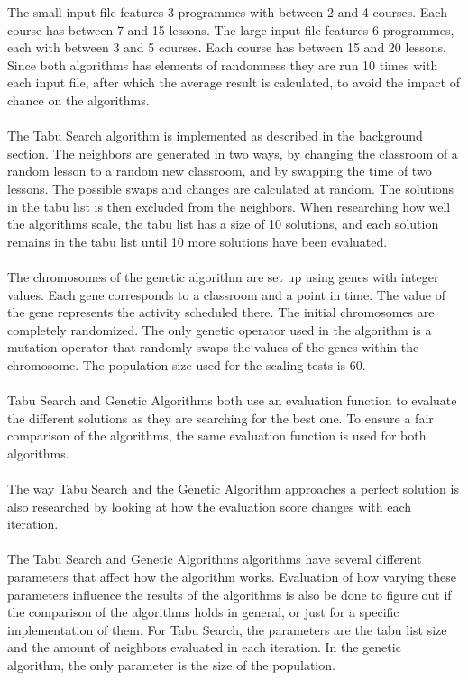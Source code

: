 \documentclass[titlepage,a4paper]{article}
\begin{document}
The small input file features 3 programmes with between 2 and 4 courses. Each course has between 7 and 15 lessons.
The large input file features 6 programmes, each with between 3 and 5 courses. Each course has between 15 and 20 lessons.
Since both algorithms has elements of randomness they are run 10 times with each input file, after which the average result is calculated, to avoid the impact of chance on the algorithms. \\\\
The Tabu Search algorithm is implemented as described in the background section. The neighbors are generated in two ways, by changing the classroom of a random lesson to a random new classroom, and by swapping the time of two lessons. The possible swaps and changes are calculated at random. The solutions in the tabu list is then excluded from the neighbors. When researching how well the algorithms scale, the tabu list has a size of 10 solutions, and each solution remains in the tabu list until 10 more solutions have been evaluated. \\\\
The chromosomes of the genetic algorithm are set up using genes with integer values. Each gene corresponds to a classroom and a point in time. The value of the gene represents the activity scheduled there. The initial chromosomes are completely randomized. The only genetic operator used in the algorithm is a mutation operator that randomly swaps the values of the genes within the chromosome. The population size used for the scaling tests is 60. \\\\
Tabu Search and Genetic Algorithms both use an evaluation function to evaluate the different solutions as they are searching for the best one. To ensure a fair comparison of the algorithms, the same evaluation function is used for both algorithms. \\\\
The way Tabu Search and the Genetic Algorithm approaches a perfect solution is also researched by looking at how the evaluation score changes with each iteration. \\\\
The Tabu Search and Genetic Algorithms algorithms have several different parameters that affect how the algorithm works. Evaluation of how varying these parameters influence the results of the algorithms is also be done to figure out if the comparison of the algorithms holds in general, or just for a specific implementation of them.
For Tabu Search, the parameters are the tabu list size and the amount of neighbors evaluated in each iteration. 
In the genetic algorithm, the only parameter is the size of the population.
\end{document}
